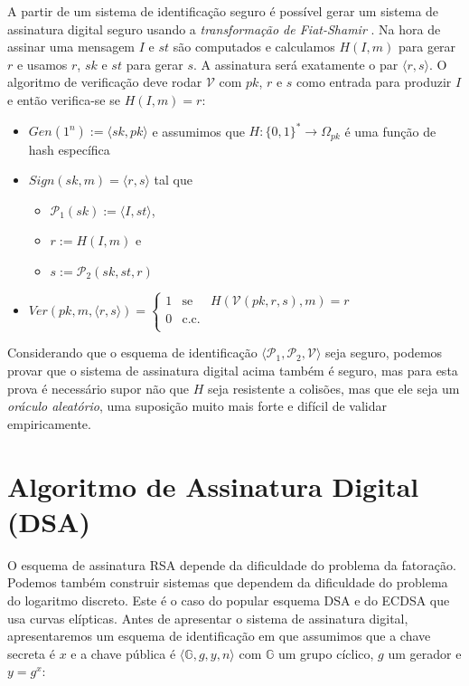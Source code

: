 A partir de um sistema de identificação seguro é possível gerar um sistema de assinatura digital seguro usando a {\em transformação de Fiat-Shamir} \cite{Fiat87}. 
Na hora de assinar uma mensagem $I$ e $st$ são computados e calculamos $H(I, m)$ para gerar $r$ e usamos $r$, $sk$ e $st$ para gerar $s$.
A assinatura será exatamente o par $\langle r, s \rangle$.
O algoritmo de verificação deve rodar $\mathcal{V}$ com $pk$, $r$ e $s$ como entrada para produzir $I$ e então verifica-se se $H(I, m) = r$: 

\begin{itemize}
\item $Gen(1^n) := \langle sk, pk \rangle$ e assumimos que $H: \{0,1\}^* \to \Omega_{pk}$ é uma função de hash específica
\item $Sign(sk, m) = \langle r, s \rangle$ tal que
\begin{itemize}
\item $\mathcal{P}_1(sk) := \langle I, st \rangle$,
\item $r := H(I, m)$ e
\item $s := \mathcal{P}_2(sk, st, r)$
\end{itemize}
\item $Ver(pk, m, \langle r, s \rangle) = \left\{
    \begin{array}{lcl}
      1 & \textrm{se} & H(\mathcal{V}(pk, r, s), m) = r\\
      0 & \textrm{c.c.} &\\
    \end{array}
    \right.$
\end{itemize}

Considerando que o esquema de identificação $\langle \mathcal{P}_1, \mathcal{P}_2, \mathcal{V} \rangle$ seja seguro, podemos provar que o sistema de assinatura digital acima também é seguro, mas para esta prova é necessário supor não que $H$ seja resistente a colisões, mas que ele seja um {\em oráculo aleatório}, uma suposição muito mais forte e difícil de validar empiricamente.

\section{Algoritmo de Assinatura Digital (DSA)}
\label{sec:dsa}

O esquema de assinatura RSA depende da dificuldade do problema da fatoração.
Podemos também construir sistemas que dependem da dificuldade do problema do logaritmo discreto.
Este é o caso do popular esquema DSA e do ECDSA que usa curvas elípticas.
Antes de apresentar o sistema de assinatura digital, apresentaremos um esquema de identificação em que assumimos que a chave secreta é $x$ e a chave pública é $\langle \mathbb{G}, g, y, n \rangle$ com $\mathbb{G}$ um grupo cíclico, $g$ um gerador e $y = g^x$:

